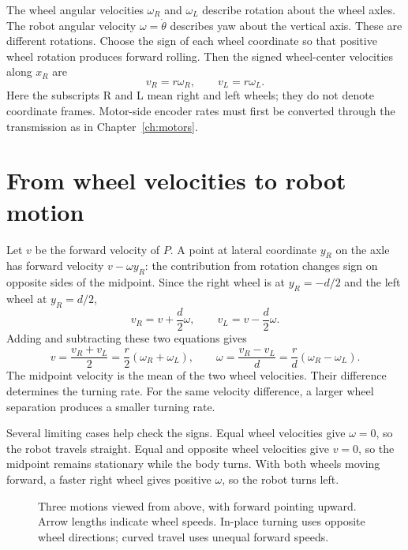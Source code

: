 The wheel angular velocities $\omega_R$ and $\omega_L$ describe rotation
about the wheel axles. The robot angular velocity $\omega=\dot\theta$
describes yaw about the vertical axis. These are different rotations.
Choose the sign of each wheel coordinate so that positive wheel rotation
produces forward rolling. Then the signed wheel-center velocities along
$x_R$ are
\begin{equation}
 v_R=r\omega_R,\qquad v_L=r\omega_L.
 \label{eq:l09-wheel}
\end{equation}
Here the subscripts R and L mean right and left wheels; they do not denote
coordinate frames. Motor-side encoder rates must first be converted through
the transmission as in Chapter~\ref{ch:motors}.

\section{From wheel velocities to robot motion}
Let $v$ be the forward velocity of $P$. A point at lateral coordinate $y_R$
on the axle has forward velocity $v-\omega y_R$: the contribution from
rotation changes sign on opposite sides of the midpoint. Since the right
wheel is at $y_R=-d/2$ and the left wheel at $y_R=d/2$,
\[
 v_R=v+\frac d2\omega,\qquad
 v_L=v-\frac d2\omega.
\]
Adding and subtracting these two equations gives
\begin{equation}
 \boxed{v=\frac{v_R+v_L}{2}=\frac r2(\omega_R+\omega_L),
 \qquad \omega=\frac{v_R-v_L}{d}
 =\frac r d(\omega_R-\omega_L).}
 \label{eq:l09-forward}
\end{equation}
The midpoint velocity is the mean of the two wheel velocities. Their
difference determines the turning rate. For the same velocity difference,
a larger wheel separation produces a smaller turning rate.

Several limiting cases help check the signs. Equal wheel velocities give
$\omega=0$, so the robot travels straight. Equal and opposite wheel
velocities give $v=0$, so the midpoint remains stationary while the body
turns. With both wheels moving forward, a faster right wheel gives positive
$\omega$, so the robot turns left.

\begin{figure}[htbp]
\centering
\caption{Three motions viewed from above, with forward pointing upward.
Arrow lengths indicate wheel speeds. In-place turning uses opposite wheel
directions; curved travel uses unequal forward speeds.}
\end{figure}

